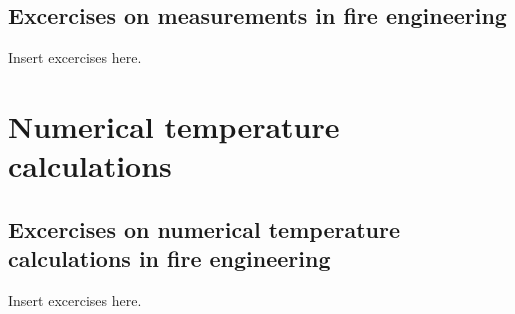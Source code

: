 \documentclass[
  letterpaper,
  DIV=11,
  numbers=noendperiod]{scrreprt}
\begin{document}
\section{Excercises on measurements in fire
engineering}\label{sec-measurementx}

Insert excercises here.


\chapter{Numerical temperature calculations}\label{sec-tempcalc}

\section{Excercises on numerical temperature calculations in fire
engineering}\label{sec-tempcalcx}

Insert excercises here.
\end{document}

